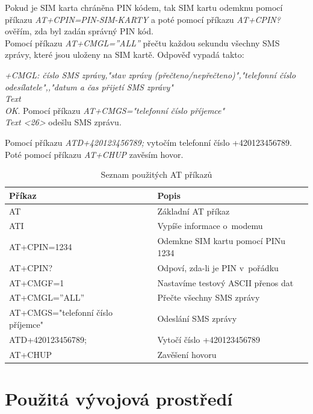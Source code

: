 \documentclass[12pt,a4paper,oneside]{article}
\begin{document}
Pokud je SIM karta chráněna PIN kódem, tak SIM kartu odemknu pomocí příkazu \textit{AT+CPIN=PIN-SIM-KARTY} a poté pomocí příkazu \textit{AT+CPIN?} ověřím, zda byl zadán správný PIN kód. \\

Pomocí příkazu \textit{AT+CMGL=”ALL”} přečtu každou sekundu všechny SMS zprávy, které jsou uloženy na SIM kartě. Odpověď vypadá takto:

\textit{+CMGL: číslo SMS zprávy,"stav zprávy (přečteno/nepřečteno)","telefonní číslo odesílatele",,"datum a čas přijetí SMS zprávy" \\ Text \\ OK}. 
Pomocí příkazu \textit{AT+CMGS="telefonní číslo příjemce" \\ Text <26>} odešlu SMS zprávu.

Pomocí příkazu \textit{ATD+420123456789;} vytočím telefonní číslo +420123456789. Poté pomocí příkazu \textit{AT+CHUP} zavěsím hovor.

\begin{table}[H]
	\centering
	\begin{tabular}{|l|l|}
		\hline 
		\textbf{Příkaz} & \textbf{Popis} \\ 
		\hline 
		\hline 
		AT & Základní AT příkaz \\ 
		\hline 
		ATI & Vypíše informace o~modemu \\ 
		\hline 
		AT+CPIN=1234 & Odemkne SIM kartu pomocí PINu 1234 \\ 
		\hline 
		AT+CPIN? & Odpoví, zda-li je PIN v~pořádku \\ 
		\hline 
		AT+CMGF=1 & Nastavíme testový ASCII přenos dat \\ 
		\hline 
		AT+CMGL=”ALL” & Přečte všechny SMS zprávy \\ 
		\hline 
		AT+CMGS="telefonní číslo příjemce"& Odeslání SMS zprávy \\ 
		\hline 
		ATD+420123456789; & Vytočí číslo +420123456789 \\ 
		\hline 
		AT+CHUP & Zavěšení hovoru \\ 
		\hline 
	\end{tabular}
	\caption{Seznam použitých AT příkazů}\label{table:at-prikazy}
\end{table}

\newpage

\section{Použitá vývojová prostředí}
\end{document}
